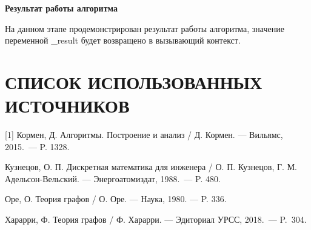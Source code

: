 \documentclass[a4paper]{article}
\begin{document}
\textbf{Результат работы алгоритма}
  \begin{figure}[!h]
  \end{figure}
\par
  На данном этапе продемонстрирован результат работы алгоритма, значение переменной \_result будет возвращено в вызывающий контекст. 
\newpage


\section*{СПИСОК ИСПОЛЬЗОВАННЫХ ИСТОЧНИКОВ}
  [1] Кормен, Д. Алгоритмы. Построение и анализ / Д. Кормен. — Вильямс, 2015.~— P. 1328.\par
  [2] Кузнецов, О. П. Дискретная математика для инженера / О. П. Кузнецов, Г. М. Адельсон-Вельский. — Энергоатомиздат, 1988.~— P. 480.\par
  [3] Оре, О. Теория графов / О. Оре. — Наука, 1980. — P. 336.\par
  [4] Харарри, Ф. Теория графов / Ф. Харарри. — Эдиториал УРСС, 2018.~— P.~304.
\end{document}
